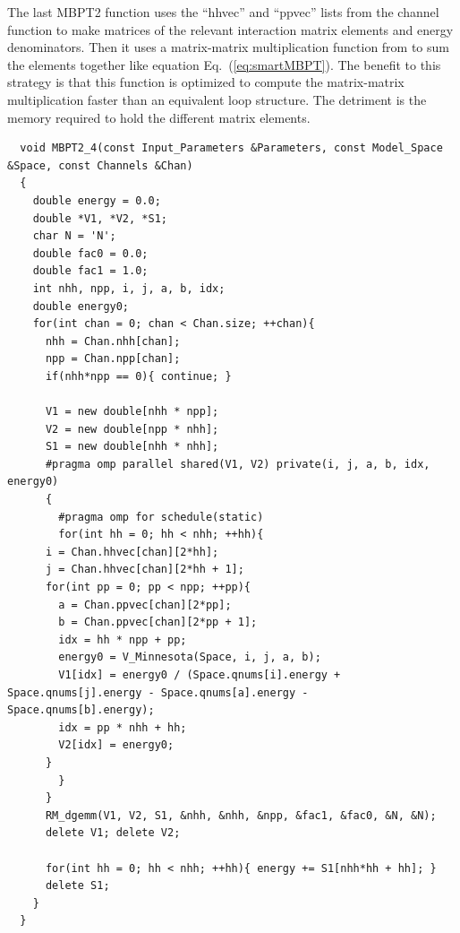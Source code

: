 The last MBPT2 function uses the ``hhvec'' and ``ppvec'' lists from the channel function to make matrices of the relevant interaction matrix elements and energy denominators. Then it uses a matrix-matrix multiplication function from \cite{blas} to sum the elements together like equation Eq.~(\ref{eq:smartMBPT}). The benefit to this strategy is that this function is optimized to compute the matrix-matrix multiplication faster than an equivalent loop structure. The detriment is the memory required to hold the different matrix elements.

\begin{lstlisting}
  void MBPT2_4(const Input_Parameters &Parameters, const Model_Space &Space, const Channels &Chan)
  {
    double energy = 0.0;
    double *V1, *V2, *S1;
    char N = 'N';
    double fac0 = 0.0;
    double fac1 = 1.0;
    int nhh, npp, i, j, a, b, idx;
    double energy0;
    for(int chan = 0; chan < Chan.size; ++chan){
      nhh = Chan.nhh[chan];
      npp = Chan.npp[chan];
      if(nhh*npp == 0){ continue; }
      
      V1 = new double[nhh * npp];
      V2 = new double[npp * nhh];
      S1 = new double[nhh * nhh];
      #pragma omp parallel shared(V1, V2) private(i, j, a, b, idx, energy0)
      {
        #pragma omp for schedule(static)
        for(int hh = 0; hh < nhh; ++hh){
	  i = Chan.hhvec[chan][2*hh];
	  j = Chan.hhvec[chan][2*hh + 1];
	  for(int pp = 0; pp < npp; ++pp){
	    a = Chan.ppvec[chan][2*pp];
	    b = Chan.ppvec[chan][2*pp + 1];
	    idx = hh * npp + pp;
	    energy0 = V_Minnesota(Space, i, j, a, b);
	    V1[idx] = energy0 / (Space.qnums[i].energy + Space.qnums[j].energy - Space.qnums[a].energy - Space.qnums[b].energy);
	    idx = pp * nhh + hh;
	    V2[idx] = energy0;
	  }
        }
      } 
      RM_dgemm(V1, V2, S1, &nhh, &nhh, &npp, &fac1, &fac0, &N, &N);
      delete V1; delete V2;
      
      for(int hh = 0; hh < nhh; ++hh){ energy += S1[nhh*hh + hh]; }
      delete S1;
    }
  }
\end{lstlisting}

